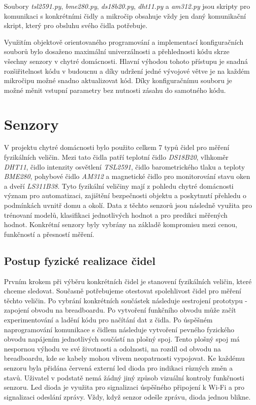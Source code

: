 Soubory \textit{tsl2591.py}, \textit{bme280.py}, \textit{ds18b20.py}, \textit{dht11.py} a \textit{am312.py} jsou skripty pro komunikaci s konkrétními čidly a mikročip obsahuje vždy jen daný komunikační skript, který pro obsluhu svého čidla potřebuje. \par
Využitím objektově orientovaného programování a implementací konfiguračních souborů bylo dosaženo maximální univerzálnosti a přehlednosti kódu skrze všechny senzory v chytré domácnosti. Hlavní výhodou tohoto přístupu je snadná rozšiřitelnost kódu v budoucnu a díky udržení jedné vývojové větve je na každém mikročipu možné snadno aktualizovat kód. Díky konfiguračnímu souboru je možné měnit vstupní parametry bez nutnosti zásahu do samotného kódu. 

\section{Senzory} \label{sec:sensors}
V projektu chytré domácnosti bylo použito celkem 7 typů čidel pro měření fyzikálních veličin. Mezi tato čidla patří teplotní čidlo \textit{DS18B20}, vlhkoměr \textit{DHT11}, čidlo intenzity osvětlení \textit{TSL2591}, čidlo barometrického tlaku a teploty \textit{BME280}, pohybové čidlo \textit{AM312} a magnetické čidlo pro monitorování stavu oken a dveří \textit{LS311B38}. Tyto fyzikální veličiny mají z pohledu chytré domácnosti význam pro automatizaci, zajištění bezpečnosti objektu a poskytnutí přehledu o podmínkách uvnitř domu a okolí. Data z těchto senzorů jsou následně využita pro trénovaní modelů, klasifikaci jednotlivých hodnot a pro predikci měřených hodnot. Konkrétní senzory byly vybrány na základě kompromisu mezi cenou, funkčností a přesností měření. 

\subsection*{Postup fyzické realizace čidel}
Prvním krokem při výběru konkrétních čidel je stanovení fyzikálních veličin, které chceme sledovat. Současně potřebujeme otestovat spolehlivost čidel pro měření těchto veličin. Po vybrání konkrétních součástek následuje sestrojení prototypu - zapojení obvodu na breadboardu. Po vytvoření funkčního obvodu může začít experimentování a ladění kódu pro načítání dat z čidla. Po úspěšném naprogramování komunikace s čidlem následuje vytvoření pevného fyzického obvodu napájením jednotlivých součástí na plošný spoj. Tento plošný spoj má nespornou výhodu ve své životnosti a odolnosti, na rozdíl od obvodu na breadboardu, kde se kabely mohou vlivem neopatrnosti vypojovat. Ke každému senzoru byla přidána červená externí led dioda pro indikaci různých změn a stavů. Uživatel v podstatě nemá žádný jiný způsob vizuální kontroly funkčnosti senzoru. Led dioda je využita pro signalizaci úspěšného připojení k Wi-Fi a pro signalizaci odeslání zprávy. Vždy, když senzor odešle zprávu, dioda jednou blikne.

